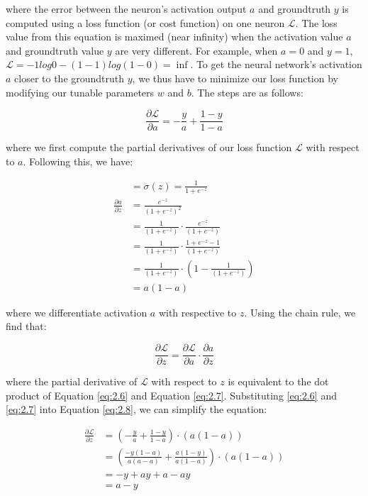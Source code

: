 where the error between the neuron's activation output $a$ and groundtruth $y$ is computed using a loss function (or cost function) on one neuron $\mathcal{L}$.
The loss value from this equation is maximed (near infinity) when the activation value $a$ and groundtruth value $y$ are very different.
For example, when $a=0$ and $y=1$, $\mathcal{L} = -1 log 0 - (1-1)log(1-0) = \inf$.
To get the neural network's activation $a$ closer to the groundtruth $y$, we thus have to minimize our loss function by modifying our tunable parameters $w$ and $b$.
The steps are as follows:

\begin{equation}\label{eq:2.6}
  \frac{\partial{\mathcal{L}}}{\partial{a}} = -\frac{y}{a} + \frac{1-y}{1-a}
\end{equation}

where we first compute the partial derivatives of our loss function $\mathcal{L}$ with respect to $a$.
Following this, we have:

\begin{equation}\label{eq:2.7}
  \begin{aligned}
    & = \sigma(z) = \frac{1}{1+e^{-z}}\\
    \frac{\partial{a}}{\partial{z}} & = \frac{e^{-z}}{(1+e^{-z})^2} \\
    & = \frac{1}{(1+e^{-z})} \cdot \frac{e^{-z}}{(1+e^{-z})} \\
    & = \frac{1}{(1+e^{-z})} \cdot \frac{1 + e^{-z} -1}{(1+e^{-z})} \\
    & = \frac{1}{(1+e^{-z})} \cdot \left( 1 - \frac{1}{(1+e^{-z})} \right) \\
    & = a(1-a)
  \end{aligned}
\end{equation}

where we differentiate activation $a$ with respective to $z$.
Using the chain rule, we find that:

\begin{equation}\label{eq:2.8}
  \frac{\partial{\mathcal{L}}}{\partial{z}} = \frac{\partial{\mathcal{L}}}{\partial{a}} \cdot \frac{\partial{a}}{\partial{z}}
\end{equation}

where the partial derivative of $\mathcal{L}$ with respect to $z$ is equivalent to the dot product of Equation \eqref{eq:2.6} and Equation \eqref{eq:2.7}.
Substituting \eqref{eq:2.6} and \eqref{eq:2.7} into Equation \eqref{eq:2.8}, we can simplify the equation:

\begin{equation}\label{eq:2.9}
  \begin{aligned}
    \frac{\partial{\mathcal{L}}}{\partial{z}} & = \left( -\frac{y}{a} + \frac{1-y}{1-a} \right) \cdot (a(1-a)) \\
    & = \left( \frac{-y(1-a)}{a(a-a)} + \frac{a(1-y)}{a(1-a)} \right) \cdot (a(1-a)) \\
    & = -y + ay + a - ay \\
    & = a - y
  \end{aligned}
\end{equation}

